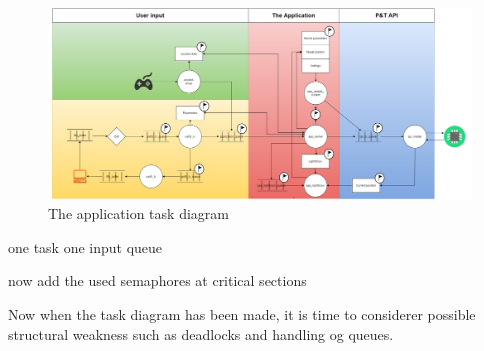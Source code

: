 \begin{figure}
	\centering
	\includegraphics[scale= 0.4, angle = 90] {Billeder/microcontroller-Task-Diagram}
	\caption{The application task diagram}
	\label{fig:applicaiton_task_diagram}
\end{figure}


one task one input queue

now add the used semaphores at critical sections

Now when the task diagram has been made, it is time to considerer possible structural weakness such as deadlocks and handling og queues. 

